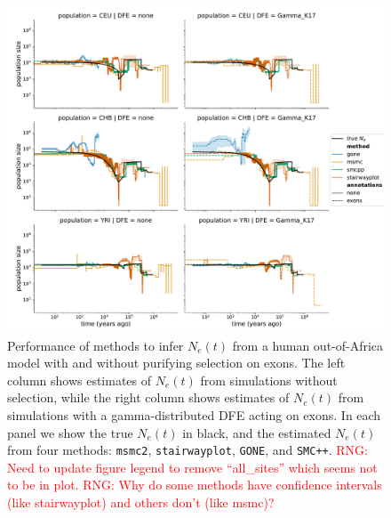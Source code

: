 \documentclass[hidelinks]{article}
\newcommand{\msmc}{\texttt{msmc2}\xspace}
\newcommand{\stairway}{\texttt{stairwayplot}\xspace}
\newcommand{\gone}{\texttt{GONE}\xspace}
\newcommand{\smcpp}{\texttt{SMC++}\xspace}
\newcommand{\rngcomment}[1]{\textcolor{red}{RNG: #1}}
\begin{document}
    \begin{figure}[t]
        \centering
        \includegraphics[width=\textwidth]{figures/HomSap/OOA/estimated_Ne_t_final}
        \caption{
        \label{fig:1pop-human-demography}
        Performance of methods to infer $N_e(t)$ from a human out-of-Africa model \citep{ragsdale2019models}
        with and without purifying selection on exons. The left column shows estimates of $N_e(t)$ from simulations
        without selection, while the right column shows estimates of $N_e(t)$ from simulations with a gamma-distributed   
        DFE acting on exons. In each panel we show the true $N_e(t)$ in black, and the estimated $N_e(t)$ from four methods:    
        \msmc \citep{Schiffels2020}, \stairway \citep{liu2020stairway}, \gone \citep{santiago2020recent}, and \smcpp \citep{terhorst2017robust}.  
        \rngcomment{Need to update figure legend to remove ``all\_sites'' which seems not to be in plot.}
        \rngcomment{Why do some methods have confidence intervals (like stairwayplot) and others don't (like msmc)?}
        }
    \end{figure}
\end{document}
